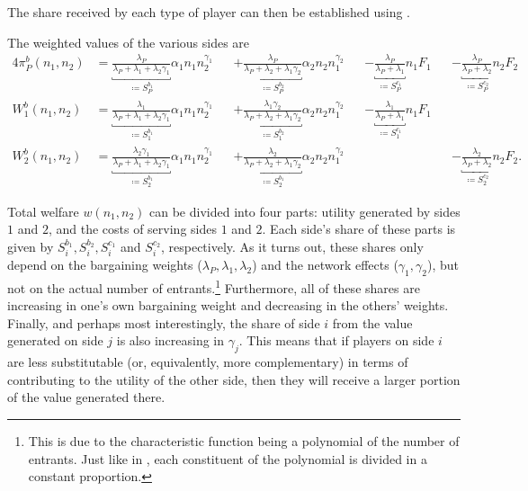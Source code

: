 The share received by each type of player can then be established using .
\begin{proposition}
    \label{prop:bargaining_entry_fees}
    The weighted values of the various sides are
    \begin{alignat*}{4}
        \pi_P^b(n_1, n_2) &= \underbracket{\frac{\lambda_P}{\lambda_P + \lambda_1 + \lambda_2\gamma_1}}_{\coloneqq S_P^{b_1}} \alpha_1 n_1 n_2^{\gamma_1} &&+ \underbracket{\frac{\lambda_P}{\lambda_P + \lambda_2 + \lambda_1\gamma_2}}_{\coloneqq S_P^{b_2}} \alpha_2 n_2 n_1^{\gamma_2} &&- \underbracket{\frac{\lambda_P}{\lambda_P + \lambda_1}}_{\coloneqq S_P^{c_1}} n_1 F_1 &&- \underbracket{\frac{\lambda_P}{\lambda_P + \lambda_2}}_{\coloneqq S_P^{c_2}} n_2 F_2 \\
        W_1^b(n_1, n_2) &= \underbracket{\frac{\lambda_1}{\lambda_P + \lambda_1 + \lambda_2\gamma_1}}_{\coloneqq S_1^{b_1}} \alpha_1 n_1 n_2^{\gamma_1} &&+ \underbracket{\frac{\lambda_1 \gamma_2}{\lambda_P + \lambda_2 + \lambda_1\gamma_2}}_{\coloneqq S_1^{b_2}}  \alpha_2 n_2 n_1^{\gamma_2} &&- \underbracket{\frac{\lambda_1}{\lambda_P + \lambda_1}}_{\coloneqq S_1^{c_1}} n_1 F_1 && \\
        W_2^b(n_1, n_2) &= \underbracket{\frac{\lambda_2\gamma_1}{\lambda_P + \lambda_1 + \lambda_2\gamma_1}}_{\coloneqq S_2^{b_1}} \alpha_1 n_1 n_2^{\gamma_1} &&+ \underbracket{\frac{\lambda_2}{\lambda_P + \lambda_2 + \lambda_1\gamma_2}}_{\coloneqq S_2^{b_1}} \alpha_2 n_2 n_1^{\gamma_2} && &&- \underbracket{\frac{\lambda_2}{\lambda_P + \lambda_2}}_{\coloneqq S_2^{c_2}} n_2 F_2.
    \end{alignat*}
\end{proposition}

Total welfare $w(n_1, n_2)$ can be divided into four parts: utility generated by sides $1$ and $2$, and the costs of serving sides $1$ and $2$.
Each side's share of these parts is given by $S_i^{b_1}, S_i^{b_2}, S_i^{c_1}$ and $S_i^{c_2}$, respectively.
As it turns out, these shares only depend on the bargaining weights ($\lambda_P, \lambda_1, \lambda_2$) and the network effects ($\gamma_1, \gamma_2$), but not on the actual number of entrants.\footnote{
    This is due to the characteristic function being a polynomial of the number of entrants.
    Just like in , each constituent of the polynomial is divided in a constant proportion.
}
Furthermore, all of these shares are increasing in one's own bargaining weight and decreasing in the others' weights.
Finally, and perhaps most interestingly, the share of side $i$ from the value generated on side $j$ is also increasing in $\gamma_j$.
This means that if players on side $i$ are less substitutable (or, equivalently, more complementary) in terms of contributing to the utility of the other side, then they will receive a larger portion of the value generated there.

